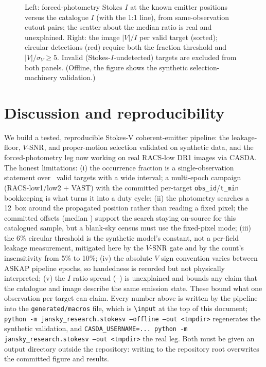 \documentclass[twocolumn]{aastex631}
\newcommand{\code}[1]{\texttt{#1}}
\begin{document}
\begin{figure}
\caption{Left: forced-photometry Stokes $I$ at the known emitter positions versus the
catalogue $I$ (with the 1:1 line), from same-observation cutout pairs; the scatter about the
median ratio is real and unexplained. Right: the image $|V|/I$ per valid target (sorted);
circular detections (red) require both the fraction threshold and $|V|/\sigma_V\ge5$.
Invalid (Stokes-$I$-undetected) targets are excluded from both panels. (Offline, the figure
shows the synthetic selection-machinery validation.)}
\label{fig:sv}
\end{figure}

\section{Discussion and reproducibility}
We build a tested, reproducible Stokes-V coherent-emitter pipeline: the leakage-floor,
$V$-SNR, and proper-motion selection validated on synthetic data, and the forced-photometry leg now
working on real RACS-low DR1 images via CASDA. The honest limitations: (i) the occurrence fraction is a single-observation statement over
\svNvalid\ valid targets with a wide interval; a multi-epoch campaign (RACS-low1/low2 $+$
VAST) with the committed per-target \code{obs\_id}/\code{t\_min} bookkeeping is what turns
it into a duty cycle; (ii) the photometry searches a 12\arcsec\ box around the propagated
position rather than reading a fixed pixel; the committed offsets (median \svMedOffset\arcsec) support the search staying on-source for this catalogued sample, but a
blank-sky census must use the fixed-pixel mode; (iii) the 6\% circular threshold is the
synthetic model's constant, not a per-field leakage measurement, mitigated here by the
$V$-SNR gate and by the count's insensitivity from 5\% to 10\%; (iv) the absolute $V$ sign
convention varies between ASKAP pipeline epochs, so handedness is recorded but not physically
interpreted; (v) the $I$ ratio spread (\svIrecMin--\svIrecMax) is unexplained and bounds any
claim that the catalogue and image describe the same emission state. These bound what one
observation per target can claim. Every number above is written by the pipeline into the
\code{generated/macros} file, which is \code{\textbackslash input} at the top of this document;
\code{python -m jansky\_research.stokesv --offline --out <tmpdir>} regenerates the synthetic
validation, and \code{CASDA\_USERNAME=... python -m jansky\_research.stokesv --out <tmpdir>}
the real leg. Both must be given an output directory outside the repository: writing to the
repository root overwrites the committed figure and results.
\end{document}
